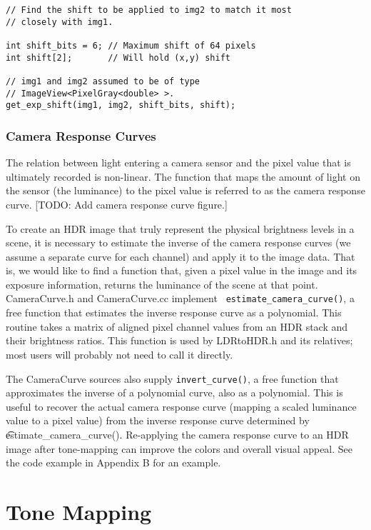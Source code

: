 \begin{verbatim}
// Find the shift to be applied to img2 to match it most
// closely with img1.

int shift_bits = 6; // Maximum shift of 64 pixels
int shift[2];       // Will hold (x,y) shift

// img1 and img2 assumed to be of type
// ImageView<PixelGray<double> >.
get_exp_shift(img1, img2, shift_bits, shift);
\end{verbatim}

\subsubsection{Camera Response Curves}
The relation between light entering a camera sensor and the pixel
value that is ultimately recorded is non-linear.  The function that
maps the amount of light on the sensor (the luminance) to the pixel
value is referred to as the camera response curve.  [TODO: Add camera
  response curve figure.]  

To create an HDR image that truly represent the physical brightness
levels in a scene, it is necessary to estimate the inverse of the
camera response curves (we assume a separate curve for each channel)
and apply it to the image data.  That is, we would like to find a
function that, given a pixel value in the image and its exposure
information, returns the luminance of the scene at that point.
CameraCurve.h and CameraCurve.cc implement {\tt
  estimate\_camera\_curve()}, a free function that estimates the
inverse response curve as a polynomial.  This routine takes a matrix
of aligned pixel channel values from an HDR stack and their brightness
ratios. This function is used by LDRtoHDR.h and its relatives; most
users will probably not need to call it directly.

The CameraCurve sources also supply {\tt invert\_curve()}, a free
function that approximates the inverse of a polynomial curve, also as
a polynomial. This is useful to recover the actual camera response
curve (mapping a scaled luminance value to a pixel value) from the
inverse response curve determined by {\t
  estimate\_camera\_curve()}. Re-applying the camera response curve to
an HDR image after tone-mapping can improve the colors and overall
visual appeal. See the code example in Appendix B for an example.

\section{Tone Mapping}


